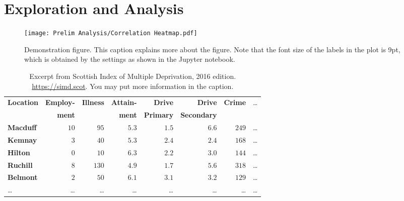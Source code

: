 \section{Exploration and Analysis}

    \begin{figure}[t]
        \centering
        \texttt{[image: Prelim Analysis/Correlation Heatmap.pdf]}
        \caption{Demonstration figure.
            This caption explains more about the figure.
            Note that the font size of the labels in the plot is 9pt, which is obtained by
                the settings as shown in the Jupyter notebook.
        }
        \label{fds-project-template:fig:example1}
    \end{figure}

    \begin{table}[b]
        \centering
        \caption{Excerpt from Scottish Index of Multiple Deprivation, 2016 edition.
            \url{https://simd.scot}.
            You may put more information in the caption.
        }
        \label{tab:example1}
        \begin{tabular}{lrrrrrrr}
            \hline\hline
            \textbf{Location} & \textbf{Employ-} & \textbf{Illness} & \textbf{Attain-} & \textbf{Drive}   & \textbf{Drive}     & \textbf{Crime} & \dots                \\
                              & \textbf{ment}    &                  & \textbf{ment}    & \textbf{Primary} & \textbf{Secondary} &                &                      \\
            \hline
            \textbf{Macduff}  & $10$             & $ 95$            & $5.3$            & $1.5$            & $6.6$              & $249$          & \dots\tabularnewline
            \textbf{Kemnay}   & $ 3$             & $ 40$            & $5.3$            & $2.4$            & $2.4$              & $168$          & \dots\tabularnewline
            \textbf{Hilton}   & $ 0$             & $ 10$            & $6.3$            & $2.2$            & $3.0$              & $144$          & \dots\tabularnewline
            \textbf{Ruchill}  & $ 8$             & $130$            & $4.9$            & $1.7$            & $5.6$              & $318$          & \dots\tabularnewline
            \textbf{Belmont}  & $ 2$             & $ 50$            & $6.1$            & $3.1$            & $3.2$              & $129$          & \dots\tabularnewline
            \dots             & \dots            & \dots            & \dots            & \dots            & \dots              & \dots          & \dots\tabularnewline
            \hline
        \end{tabular}
    \end{table}

